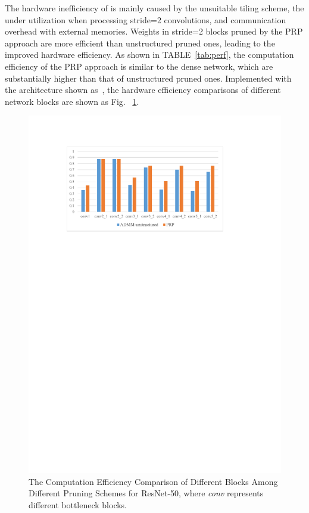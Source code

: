 \documentclass[journal,article,submit,pdftex,moreauthors]{Definitions/mdpi}
\begin{document}
The hardware inefficiency of \cite{SB} is mainly caused by the unsuitable tiling scheme, the under utilization when processing stride=2 convolutions, and communication overhead with external memories. Weights in stride=2 blocks pruned by the PRP approach are more efficient than unstructured pruned ones, leading to the improved hardware efficiency. As shown in TABLE~\ref{tab:perf}, the computation efficiency of the PRP approach is similar to the dense network, which are substantially higher than that of unstructured pruned ones. Implemented with the architecture shown as~\cite{SB}, the hardware efficiency comparisons of different network blocks are shown as Fig. ~\ref{fig: eff}.

\begin{figure} [hbt]
	\centering
	\includegraphics[width=13cm]{figs/computation efficiency.pdf}
	\caption{The Computation Efficiency Comparison of Different Blocks Among Different Pruning Schemes for ResNet-50, where \textit{conv} represents different bottleneck blocks.}
	\label{fig: eff}
\end{figure}
\end{document}
